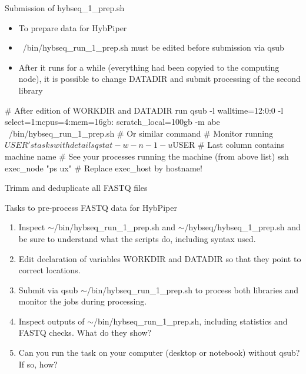 \documentclass[compress, ucs, xelatex, 11pt, xcolor=x11names, aspectratio=169,
	hyperref={
		bookmarks=true,
		unicode=true,
		colorlinks=true,
		pdftitle={HybSeq course},
		plainpages=false,
		pdfauthor={Vojtech Zeisek},
		pdfsubject={Practical processing of HybSeq target enrichment sequencing data on computing grids like MetaCentrum},
		pdfcreator={XeLaTeX},
		pdfkeywords={BASH, command line, GNU, HybSeq, Linux, MetaCentrum, sequencing shell, target enrichment},
		linkcolor=Cyan2, %
		anchorcolor=Firebrick2, %
		citecolor=Firebrick2, %
		filecolor=Firebrick2, %
		menucolor=Firebrick2, %
		urlcolor=Chartreuse2, %
		pdftex},
	url={hyphens, lowtilde} %
	]{beamer}
\renewcommand{\texttt}[1]{\colorbox{Snow4}{{\ttfamily #1}}}
\renewcommand{\alert}[1]{\textcolor{OrangeRed2}{#1}}
\begin{document}
\begin{frame}[fragile]{Submission of hybseq\_1\_prep.sh}
	\begin{itemize}
		\item To prepare data for HybPiper
		\item \alert{\texttt{~/bin/hybseq\_run\_1\_prep.sh} must be edited before submission via \texttt{qsub}}
		\item After it runs for a while (everything had been copyied to the computing node), it is possible to change \texttt{DATADIR} and submit processing of the second library
	\end{itemize}
	\begin{bashcode}
    # After edition of WORKDIR and DATADIR run
    qsub -l walltime=12:0:0 -l select=1:ncpus=4:mem=16gb:
      scratch_local=100gb -m abe ~/bin/hybseq_run_1_prep.sh
    # Or similar command
    # Monitor running $USER's tasks with details
    qstat -w -n -1 -u $USER # Last column contains machine name
    # See your processes running the machine (from above list)
    ssh exec_node "ps ux" # Replace exec_host by hostname!
	\end{bashcode}
\end{frame}

\begin{frame}{Trimm and deduplicate all FASTQ files}
	\begin{exampleblock}{Tasks to pre-process FASTQ data for HybPiper}
			\begin{enumerate}
				\item Inspect \texttt{$\sim$/bin/hybseq\_run\_1\_prep.sh} and \texttt{$\sim$/hybseq/hybseq\_1\_prep.sh} and be sure to understand what the scripts do, including syntax used.
				\item Edit declaration of variables \texttt{WORKDIR} and \texttt{DATADIR} so that they point to correct locations.
				\item Submit via \texttt{qsub} \texttt{$\sim$/bin/hybseq\_run\_1\_prep.sh} to process both libraries and monitor the jobs during processing.
				\item Inspect outputs of \texttt{$\sim$/bin/hybseq\_run\_1\_prep.sh}, including statistics and FASTQ checks. What do they show?
				\item Can you run the task on your computer (desktop or notebook) without \texttt{qsub}? If so, how?
		\end{enumerate}
	\end{exampleblock}
\end{frame}
\end{document}
